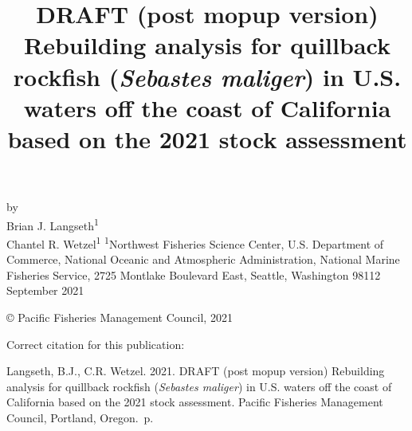 \documentclass[11pt,
  english,
  a4paper,
]{article}
\date{}
\newcommand{\trTitle}{DRAFT (post mopup version) Rebuilding analysis for quillback rockfish (\emph{Sebastes maliger}) in U.S. waters off the coast of California based on the 2021 stock assessment}
\newcommand{\trYear}{2021}
\newcommand{\trMonth}{September}
\newcommand{\trAuthsBack}{Langseth, B.J., C.R. Wetzel}
\newcommand{\trCitation}{
\begin{hangparas}{1em}{1}
\trAuthsBack{}. \trYear{}. \trTitle{}. Pacific Fisheries Management Council, Portland, Oregon. \pageref{LastPage}{}\,p.
\end{hangparas}}
\begin{document}

\renewcommand*{\thefootnote}{\fnsymbol{footnote}}

\small
\thispagestyle{empty}
\noindent
\begin{center}
\title{DRAFT (post mopup version) Rebuilding analysis for quillback rockfish (\emph{Sebastes maliger}) in U.S. waters off the coast of California based on the 2021 stock assessment}
\vspace{1.5cm}
{\Large\textbf{}}
\vfill
by\\
Brian J. Langseth\textsuperscript{1}\\
Chantel R. Wetzel\textsuperscript{1}\vfill
\textsuperscript{1}Northwest Fisheries Science Center, U.S. Department of Commerce, National Oceanic and Atmospheric Administration, National Marine Fisheries Service, 2725 Montlake Boulevard East, Seattle, Washington 98112\vfill
\trMonth{} \trYear{}
\end{center}
\clearpage

\thispagestyle{empty}
\vspace*{\fill}
\begin{center}
\copyright{} Pacific Fisheries Management Council, \trYear{}\\
\end{center}
\par
\bigskip
\noindent
Correct citation for this publication:
\bigskip
\par
\trCitation{}
\clearpage


\tableofcontents\clearpage
\label{TRlastRoman}
\clearpage

\newpage
\thispagestyle{empty} %

\pagestyle{plain}  %
\renewcommand*{\thefootnote}{\arabic{footnote}}  %
\setcounter{footnote}{0}  %
\renewcommand{\headrulewidth}{0.5pt}
\renewcommand{\footrulewidth}{0.5pt}
\end{document}

